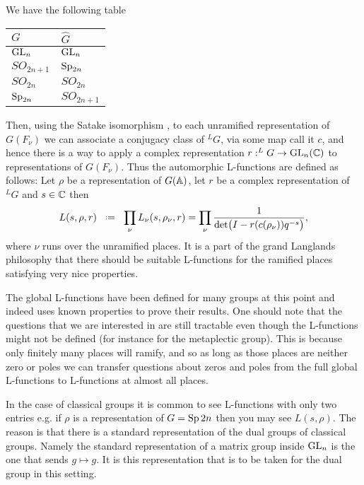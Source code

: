 \begin{example}
	We have the following table
	\begin{table}[h]
		\centering
		\begin{tabular}{ll}
			\(G\)         & \(\hat{G}\)   \\ \hline
			\(\operatorname{GL}_n\)     & \(\operatorname{GL}_n\)     \\
			\(SO_{2n+1}\) & \(\operatorname{Sp}_{2n}\)  \\
			\(SO_{2n}\)   & \(SO_{2n}\)   \\
			\(\operatorname{Sp}_{2n}\)  & \(SO_{2n+1}\)
		\end{tabular}
	\end{table}
\end{example}

Then, using the Satake isomorphism \cite[2.2]{shahidiEisensteinSeriesAutomorphic2010}, to each unramified representation of \(G(F_\nu)\) we can associate a conjugacy class of \(^LG\), via some map call it \(c\), and hence there is a way to apply a complex representation \(r: ^LG \to \GL_n(\C)\) to representations of \(G(F_\nu)\). Thus the automorphic L-functions are defined as follows: Let \(\rho\) be a representation of \(G(\A)\), let \(r\) be a complex representation of \(^LG\) and \(s\in \C\) then 
\[L(s, \rho, r) \defeq \prod_\nu L_\nu(s, \rho_\nu, r ) = \prod_\nu \frac{1}{\det\bigl( I - r(c(\rho_\nu))q^{-s} \bigr)}  ,\]
where \(\nu\) runs over the unramified places. It is a part of the grand Langlands philosophy that there should be suitable L-functions for the ramified places satisfying very nice properties.

\begin{remark}
	The global L-functions have been defined for many groups at this point and indeed \cite{jiangPolesCertainResidual2013} uses known properties to prove their results. One should note that the questions that we are interested in are still tractable even though the L-functions might not be defined (for instance for the metaplectic group). This is because only finitely many places will ramify, and so as long as those places are neither zero or poles we can transfer questions about zeros and poles from the full global L-functions to L-functions at almost all places. 
\end{remark}

\begin{example}
	In the case of classical groups it is common to see L-functions with only two entries e.g. if \(\rho\) is a representation of \(G = \operatorname{Sp}{2n}\) then you may see 
	\(L(s, \rho).\)
	The reason is that there is a standard representation of the dual groups of classical groups. Namely the standard representation of a matrix group inside \(\operatorname{GL}_n\) is the one that sends \(g\mapsto g\). It is this representation that is to be taken for the dual group in this setting.
\end{example}

